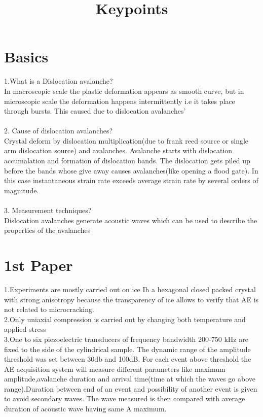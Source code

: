 \documentclass[12pt]{article}
\title{Keypoints}
\begin{document}
\maketitle
\section{Basics}
\noindent 1.What is a Dislocation avalanche?\\
 \indent   In macroscopic scale the plastic deformation appears as smooth curve, but in microscopic scale the deformation happens intermittently i.e it takes place through bursts. This caused due to dislocation avalanches'
\\  
\\
2. Cause of dislocation avalanches?\\
\indent Crystal deform by dislocation multiplication(due to frank reed source or single arm dislocation source) and avalanches. Avalanche starts with dislocation accumalation and formation of dislocation bands. The dislocation gets piled up before the bands whose give away causes avalanches(like opening a flood gate). In this case instantaneous strain rate exceeds average strain rate by several orders of magnitude.\\
\\
3. Measurement techniques?\\
\indent Dislocation avalanches generate acoustic waves which can be used to describe the properties of the avalanches

\section{1st Paper}
1.\indent Experiments are mostly carried out on ice Ih a hexagonal closed packed crystal with strong anisotropy because the transparency of ice allows to verify that AE is not related to microcracking.
\\
2.\indent  Only uniaxial compression is carried out by changing both  temperature and applied stress \\
3.\indent One to six piezoelectric transducers of frequency bandwidth 200-750 kHz are fixed to the side of the cylindrical sample. The dynamic range of the amplitude threshold was set between 30db and 100dB. For each event above threshold the AE acquisition system will measure different parameters like maximum amplitude,avalanche duration and arrival time(time at which the waves go above range).Duration between end of an event and possibility of another event is given to avoid secondary waves. The wave measured is then compared with average duration of acoustic wave having same A maximum.
\end{document}
